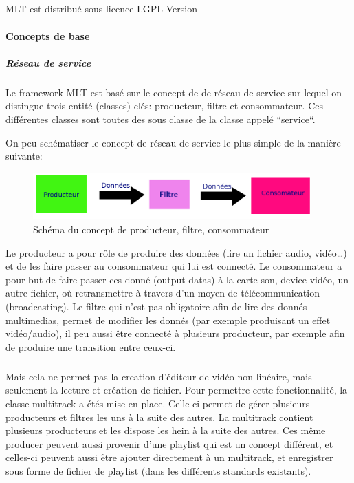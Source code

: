 \subparagraph{}

MLT est distribué sous licence LGPL Version

\paragraph{Concepts de base}

\subparagraph{Réseau de service}

\subparagraph{}

Le framework MLT est basé sur le concept de de réseau de service sur
lequel on distingue trois entité (classes) clés: producteur, filtre
et consommateur. Ces différentes classes sont toutes des sous classe
de la classe appelé ``service``.

On peu schématiser le concept de réseau de service le plus simple de
la manière suivante:

\begin{figure} [H]

  \begin{center}

    \includegraphics[width=0.95\textwidth]{images/producerConsumer}

  \end{center}

  \caption{Schéma du concept de producteur, filtre, consommateur}

  \label{Yes}

\end{figure}

Le producteur a pour rôle de produire des données (lire un fichier
audio, vidéo\ldots) et de les faire passer au consommateur qui lui est
connecté. Le consommateur a pour but de faire passer ces donné (output
datas) à la carte son, device vidéo, un autre fichier, où retransmettre
à travers d'un moyen de télécommunication (broadcasting).  Le filtre
qui n'est pas obligatoire afin de lire des donnés multimedias, permet
de modifier les donnés (par exemple produisant un effet vidéo/audio),
il peu aussi être connecté à plusieurs producteur, par exemple afin
de produire une transition entre ceux-ci.

\subparagraph{}

Mais cela ne permet pas la creation d'éditeur de vidéo non linéaire,
mais seulement la lecture et création de fichier. Pour permettre cette
fonctionnalité, la classe multitrack a étés mise en place. Celle-ci
permet de gérer plusieurs producteurs et filtres les uns à la suite des
autres. La multitrack contient plusieurs producteurs et les dispose les
hein à la suite des autres. Ces même producer peuvent aussi provenir
d'une playlist qui est un concept différent, et celles-ci peuvent aussi
être ajouter directement à un multitrack, et enregistrer sous forme
de fichier de playlist (dans les différents standards existants).

